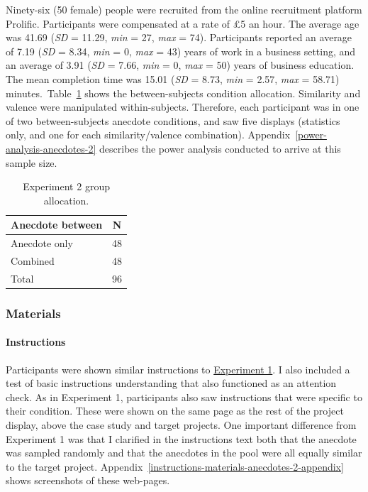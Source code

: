 \documentclass[a4paper, nobind, dvipsnames]{templates/ociamthesis}
\theoremstyle{definition}
\theoremstyle{definition}
\theoremstyle{definition}
\theoremstyle{definition}
\theoremstyle{remark}
\begin{document}
Ninety-six (50 female) people were recruited from the online recruitment platform Prolific. Participants were compensated at a rate of £5 an hour. The average age was 41.69 (\emph{SD} = 11.29, \emph{min} = 27, \emph{max} = 74). Participants reported an average of 7.19 (\emph{SD} = 8.34, \emph{min} = 0, \emph{max} = 43) years of work in a business setting, and an average of 3.91 (\emph{SD} = 7.66, \emph{min} = 0, \emph{max} = 50) years of business education. The mean completion time was 15.01 (\emph{SD} = 8.73, \emph{min} = 2.57, \emph{max} = 58.71) minutes.~Table~\ref{tab:condition-allocation-anecdotes-2}
shows the between-subjects condition allocation. Similarity and valence were
manipulated within-subjects. Therefore, each participant was in one of two
between-subjects anecdote conditions, and saw five displays (statistics only,
and one for each similarity/valence combination).
Appendix~\ref{power-analysis-anecdotes-2} describes the power analysis
conducted to arrive at this sample size.

\begin{table}[tbp]

\begin{center}
\begin{threeparttable}

\caption{\label{tab:condition-allocation-anecdotes-2}Experiment 2 group allocation.}

\begin{tabular}{ll}
\toprule
Anecdote between & \multicolumn{1}{c}{N}\\
\midrule
Anecdote only & 48\\
Combined & 48\\
Total & 96\\
\bottomrule
\end{tabular}

\end{threeparttable}
\end{center}

\end{table}

\subsubsection{Materials}

\paragraph{Instructions}

Participants were shown similar instructions to \protect\hyperlink{instructions-materials-anecdotes-1}{Experiment
1}. I also included a test of basic
instructions understanding that also functioned as an attention check. As in
Experiment 1, participants also saw instructions that were specific to their
condition. These were shown on the same page as the rest of the project display,
above the case study and target projects. One important difference from
Experiment 1 was that I clarified in the instructions text both that the
anecdote was sampled randomly and that the anecdotes in the pool were all
equally similar to the target project.
Appendix~\ref{instructions-materials-anecdotes-2-appendix} shows screenshots of
these web-pages.
\end{document}
